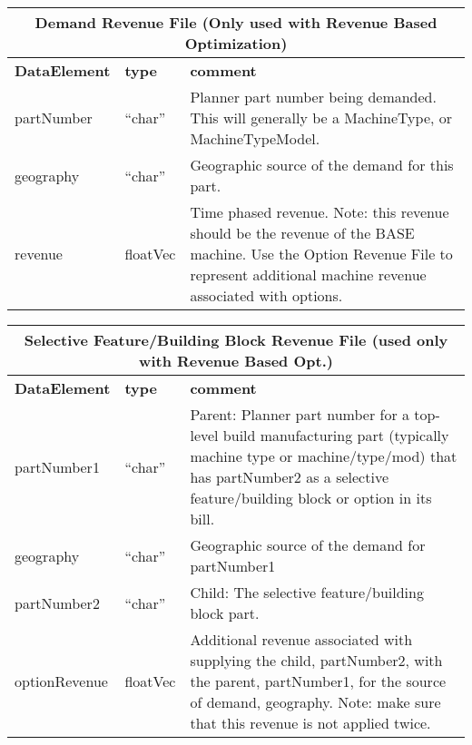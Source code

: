 \vspace{.5in}

\begin{tabular}{llp{4in}}
\multicolumn{3}{c}{{\bf Demand Revenue  File  (Only used with Revenue Based Optimization)}}\\ 
     \hline\hline
{\bf DataElement} &  {\bf type}  &   {\bf comment} \\ \hline
partNumber & ``char'' & Planner part number being demanded.  This will generally be a
                       MachineType, or MachineTypeModel. \\
geography  & ``char'' &    Geographic source of the demand for this part. \\
revenue    &  floatVec &  Time phased revenue. Note: this revenue should be
                       the revenue of the BASE machine.  Use the Option 
                       Revenue File to represent additional machine
                       revenue associated with options.
\end{tabular}

\vspace{.5in}

\begin{tabular}{llp{4in}}
\multicolumn{3}{c}{{\bf Selective Feature/Building Block Revenue File 
          (used only with Revenue Based Opt.)}}\\ 
     \hline\hline
{\bf DataElement} &  {\bf type}  &   {\bf comment} \\ \hline
partNumber1 & ``char'' &    Parent: Planner part number for a top-level build manufacturing 
                           part (typically machine type or machine/type/mod) that has 
                           partNumber2 as a selective feature/building block or option
                          in its bill. \\
geography  & ``char'' &   Geographic source of the demand for partNumber1 \\
partNumber2 & ``char'' &    Child: The selective feature/building block part. \\
optionRevenue  & floatVec &  Additional revenue associated with supplying the child, partNumber2,
                           with the parent, partNumber1, for the source of demand, geography.
                           Note: make sure that this revenue is not applied twice.
\end{tabular}

\vspace{.5in}


